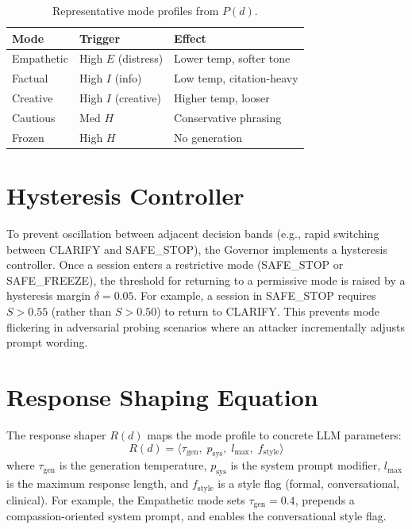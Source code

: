 \documentclass[11pt]{article}
\begin{document}
\begin{table}[h]
\centering
\small
\begin{tabular}{@{}lll@{}}
\toprule
\textbf{Mode} & \textbf{Trigger} & \textbf{Effect} \\
\midrule
Empathetic & High $E$ (distress) & Lower temp, softer tone \\
Factual & High $I$ (info) & Low temp, citation-heavy \\
Creative & High $I$ (creative) & Higher temp, looser \\
Cautious & Med $H$ & Conservative phrasing \\
Frozen & High $H$ & No generation \\
\bottomrule
\end{tabular}
\caption{Representative mode profiles from $P(d)$.}
\label{tab:modes}
\end{table}

\section{Hysteresis Controller}
\label{app:hysteresis}

To prevent oscillation between adjacent decision bands (e.g., rapid switching between CLARIFY and SAFE\_STOP), the Governor implements a hysteresis controller.
Once a session enters a restrictive mode (SAFE\_STOP or SAFE\_FREEZE), the threshold for returning to a permissive mode is raised by a hysteresis margin $\delta = 0.05$.
For example, a session in SAFE\_STOP requires $S > 0.55$ (rather than $S > 0.50$) to return to CLARIFY.
This prevents mode flickering in adversarial probing scenarios where an attacker incrementally adjusts prompt wording.

\section{Response Shaping Equation}
\label{app:response}

The response shaper $R(d)$ maps the mode profile to concrete LLM parameters:
\begin{equation}
R(d) = \langle \tau_{\text{gen}},\; p_{\text{sys}},\; l_{\max},\; f_{\text{style}} \rangle
\end{equation}
where $\tau_{\text{gen}}$ is the generation temperature, $p_{\text{sys}}$ is the system prompt modifier, $l_{\max}$ is the maximum response length, and $f_{\text{style}}$ is a style flag (formal, conversational, clinical).
For example, the Empathetic mode sets $\tau_{\text{gen}}{=}0.4$, prepends a compassion-oriented system prompt, and enables the conversational style flag.
\end{document}

